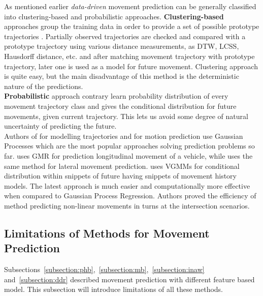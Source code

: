 As mentioned earlier \textit{data-driven} movement prediction can be generally classified into clustering-based and probabilistic approaches.  \textbf{Clustering-based} approaches group the training data in order to provide a set of possible prototype trajectories \cite{DataDrivenI, DataDrivenII}. Partially observed trajectories are checked and compared with a prototype trajectory using various distance measurements, as \gls{DTW}, \gls{LCSS}, Hausdorff distance, etc. and after matching movement trajectory with prototype trajectory, later one is used as a model for future movement. Clustering approach is quite easy, but the main disadvantage of this method is the deterministic nature of the predictions. \\
\textbf{Probabilistic} approach contrary learn probability distribution of every movement trajectory class and gives the conditional distribution for future movements, given current trajectory. This lets us avoid some degree of natural uncertainty of predicting the future. \\
Authors of \cite{DataDrivenIII, DataDrivenIV} for modelling trajectories and for motion prediction use Gaussian Processes which are the most popular approaches solving prediction problems so far. \cite{DataDrivenV} uses \gls{GMR} for prediction longitudinal movement of a vehicle, while \cite{DataDrivenVI} uses the same method for lateral movement prediction. \cite{DataDrivenVII} uses \glspl{VGMM} for conditional distribution within snippets of future having snippets of movement history models. The latest approach is much easier and computationally more effective when compared to Gaussian Process Regression.  Authors proved the efficiency of method predicting non-linear movements in turns at the intersection scenarios. 

\subsection{Limitations of Methods for Movement Prediction}

Subsections~\ref{subsection:phb},~\ref{subsection:mb},~\ref{subsection:inaw} and~\ref{subsection:ddr} described movement prediction with different feature based model. This subsection will introduce limitations of all these methods.

